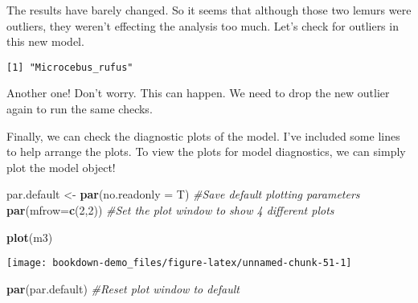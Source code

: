 \documentclass[]{book}
\newenvironment{Shaded}{\begin{snugshade}}{\end{snugshade}}
\newcommand{\KeywordTok}[1]{\textcolor[rgb]{0.13,0.29,0.53}{\textbf{#1}}}
\newcommand{\DataTypeTok}[1]{\textcolor[rgb]{0.13,0.29,0.53}{#1}}
\newcommand{\DecValTok}[1]{\textcolor[rgb]{0.00,0.00,0.81}{#1}}
\newcommand{\StringTok}[1]{\textcolor[rgb]{0.31,0.60,0.02}{#1}}
\newcommand{\CommentTok}[1]{\textcolor[rgb]{0.56,0.35,0.01}{\textit{#1}}}
\newcommand{\OtherTok}[1]{\textcolor[rgb]{0.56,0.35,0.01}{#1}}
\newcommand{\OperatorTok}[1]{\textcolor[rgb]{0.81,0.36,0.00}{\textbf{#1}}}
\newcommand{\NormalTok}[1]{#1}
\begin{document}
The results have barely changed. So it seems that although those two
lemurs were outliers, they weren't effecting the analysis too much.
Let's check for outliers in this new model.

\begin{Shaded}
\end{Shaded}

\begin{verbatim}
[1] "Microcebus_rufus"
\end{verbatim}

Another one! Don't worry. This can happen. We need to drop the new
outlier again to run the same checks.

Finally, we can check the diagnostic plots of the model. I've included
some lines to help arrange the plots. To view the plots for model
diagnostics, we can simply plot the model object!

\begin{Shaded}
\begin{Highlighting}[]
\NormalTok{par.default <-}\StringTok{ }\KeywordTok{par}\NormalTok{(}\DataTypeTok{no.readonly =}\NormalTok{ T) }\CommentTok{#Save default plotting parameters}
\KeywordTok{par}\NormalTok{(}\DataTypeTok{mfrow=}\KeywordTok{c}\NormalTok{(}\DecValTok{2}\NormalTok{,}\DecValTok{2}\NormalTok{)) }\CommentTok{#Set the plot window to show 4 different plots}

\KeywordTok{plot}\NormalTok{(m3)}
\end{Highlighting}
\end{Shaded}

\begin{center}\texttt{[image: bookdown-demo\_files/figure-latex/unnamed-chunk-51-1]} \end{center}

\begin{Shaded}
\begin{Highlighting}[]
\KeywordTok{par}\NormalTok{(par.default) }\CommentTok{#Reset plot window to default}
\end{Highlighting}
\end{Shaded}
\end{document}
